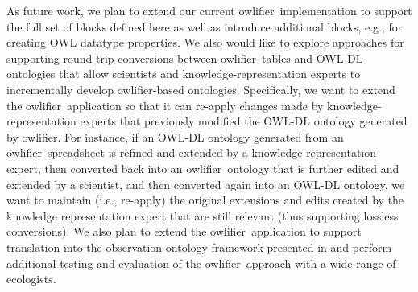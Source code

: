 \documentclass[5p,authoryear]{elsarticle}
\newcommand{\owlifier}{\textsf{owlifier}}
\begin{document}
As future work, we plan to extend our current \owlifier\ implementation to support the full set of blocks defined here as well as introduce additional blocks, e.g., for creating OWL datatype properties. We also would like to explore approaches for supporting round-trip conversions between \owlifier\ tables and OWL-DL ontologies that allow scientists and knowledge-representation experts to incrementally develop \owlifier-based ontologies.  Specifically, we want to extend the \owlifier\ application so that it can re-apply changes made by knowledge-representation experts that previously modified the OWL-DL ontology generated by \owlifier. For instance, if an OWL-DL ontology generated from an \owlifier\ spreadsheet is refined and extended by a knowledge-representation expert, then converted back into an \owlifier\ ontology that is further edited and extended by a scientist, and then converted again into an OWL-DL ontology, we want to maintain (i.e., re-apply) the original extensions and edits created by the knowledge representation expert that are still relevant (thus supporting lossless conversions).  We also plan to extend the \owlifier\ application to support translation into the observation ontology framework presented in \citep{bowers08:_concep_model_framew_for_expres} and perform additional testing and evaluation of the \owlifier\ approach with a wide range of ecologists.

%


\end{document}
